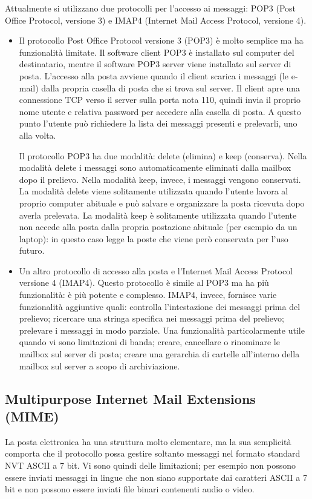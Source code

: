 Attualmente si utilizzano due protocolli per l'accesso ai messaggi: POP3 (Post Office Protocol, versione 3) e IMAP4 (Internet Mail Access Protocol, versione 4).
\begin{itemize}
    \item Il protocollo Post Office Protocol versione 3 (POP3) è molto semplice ma ha funzionalità limitate. Il software client POP3 è installato sul computer del destinatario, mentre il software POP3 server viene installato sul server di posta. L'accesso alla posta avviene quando il client scarica i messaggi (le e-mail) dalla propria casella di posta che si trova sul server. Il client apre una connessione TCP verso il server sulla porta nota 110, quindi invia il proprio nome utente e relativa password per accedere alla casella di posta. A questo punto l'utente può richiedere la lista dei messaggi presenti e prelevarli, uno alla volta.

    Il protocollo POP3 ha due modalità: delete (elimina) e keep (conserva). Nella modalità delete i messaggi sono automaticamente eliminati dalla mailbox dopo il prelievo. Nella modalità keep, invece, i messaggi vengono conservati. La modalità delete viene solitamente utilizzata quando l'utente lavora al proprio computer abituale e può salvare e organizzare la posta ricevuta dopo averla prelevata. La modalità keep è solitamente utilizzata quando l'utente non accede alla posta dalla propria postazione abituale (per esempio da un laptop): in questo caso legge la poste che viene però conservata per l'uso futuro.

    \item Un altro protocollo di accesso alla posta e l'Internet Mail Access Protocol versione 4 (IMAP4). Questo protocollo è simile al POP3 ma ha più funzionalità: è più potente e complesso.
    IMAP4, invece, fornisce varie funzionalità aggiuntive quali: controlla l'intestazione dei messaggi prima del prelievo; ricercare una stringa specifica nei messaggi prima del prelievo; prelevare i messaggi in modo parziale. Una funzionalità particolarmente utile quando vi sono limitazioni di banda; creare, cancellare o rinominare le mailbox sul server di posta; creare una gerarchia di cartelle all'interno della mailbox sul server a scopo di archiviazione.
\end{itemize}

\subsection{Multipurpose Internet Mail Extensions (MIME)}
La posta elettronica ha una struttura molto elementare, ma la sua semplicità comporta che il protocollo possa gestire soltanto messaggi nel formato standard NVT ASCII a 7 bit. Vi sono quindi delle limitazioni; per esempio non possono essere inviati messaggi in lingue che non siano supportate dai caratteri ASCII a 7 bit e non possono essere inviati file binari contenenti audio o video.

